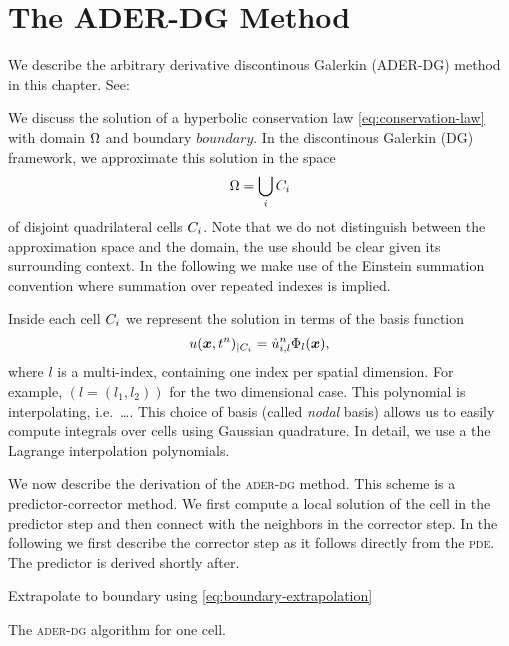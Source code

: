 \section{The ADER-DG Method}
\label{sec:ader-dg}
We describe the arbitrary derivative discontinous Galerkin (ADER-DG) method in this chapter.
See: \cite{dumbser2018efficient}

We discuss the solution of a hyperbolic conservation law \cref{eq:conservation-law} with domain $\Omega$ and boundary $boundary$.
In the discontinous Galerkin (DG) framework, we approximate this solution in the space
\begin{equation}
  \label{eq:dg-space}
  \broken = \bigcup_i \cell
\end{equation}
of disjoint quadrilateral cells $C_{i}$.
Note that we do not distinguish between the approximation space and the domain, the use should be clear given its surrounding context.
In the following we make use of the Einstein summation convention where summation over repeated indexes is implied.

Inside each cell $C_{i}$ we represent the solution in terms of the basis function 
\begin{equation}
  \label{eq:cell-approx}
  u(\bm{x}, t^n)_{|\cell[i]} = \hat{u}^n_{i,l} \sbasis{l}(\bm{x}),
\end{equation}
where $l$ is a multi-index, containing one index per spatial dimension.
For example, $(l = (l_1, l_2))$ for the two dimensional case.
This polynomial is interpolating, i.e.\ \ldots{}.
This choice of basis (called \textit{nodal} basis) allows us to easily compute integrals over cells using Gaussian quadrature.
In detail, we use a the Lagrange interpolation polynomials.

We now describe the derivation of the \textsc{ader-dg} method.
This scheme is a predictor-corrector method.
We first compute a local solution of the cell in the predictor step and then connect with the neighbors in the corrector step.
In the following we first describe the corrector step as it follows directly from the \textsc{pde}.
The predictor is derived shortly after.

\begin{algorithm}[H]
  \begin{algorithmic}
        {Extrapolate to boundary using \cref{eq:boundary-extrapolation}}
  \end{algorithmic}
  \caption{The \textsc{ader-dg} algorithm for one cell.}
\end{algorithm}

